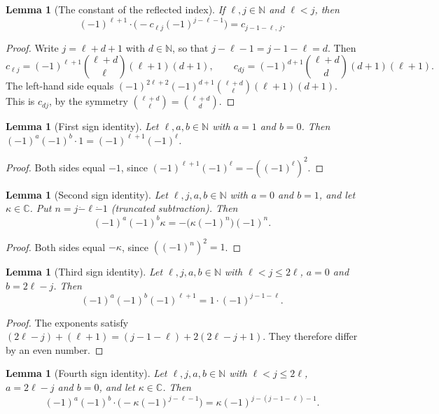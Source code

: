 \documentclass[11pt]{article}
\newtheorem{lemma}[theorem]{Lemma}
\theoremstyle{definition}
\theoremstyle{remark}
\newcommand{\CC}{\mathbb{C}}
\newcommand{\NN}{\mathbb{N}}
\newcommand{\monus}{\mathbin{\dot{-}}}
\begin{document}
\begin{lemma}[The constant of the reflected index]\label{lem:gm_pos_cst}
If $\ell,j\in\NN$ and $\ell<j$, then
\[
(-1)^{\ell+1}\cdot\bigl(-c_{\ell j}(-1)^{j-\ell-1}\bigr)=c_{j-1-\ell,\,j}.
\]
\end{lemma}

\begin{proof}
Write $j=\ell+d+1$ with $d\in\NN$, so that $j-\ell-1=j-1-\ell=d$. Then
\[
c_{\ell j}=(-1)^{\ell+1}\binom{\ell+d}{\ell}(\ell+1)(d+1),\qquad c_{d j}=(-1)^{d+1}\binom{\ell+d}{d}(d+1)(\ell+1).
\]
The left-hand side equals $(-1)^{2\ell+2}(-1)^{d+1}\binom{\ell+d}{\ell}(\ell+1)(d+1)$. This is $c_{dj}$, by the symmetry $\binom{\ell+d}{\ell}=\binom{\ell+d}{d}$.
\end{proof}

\begin{lemma}[First sign identity]\label{lem:gm_pos_signX}
Let $\ell,a,b\in\NN$ with $a=1$ and $b=0$. Then $(-1)^a(-1)^b\cdot1=(-1)^{\ell+1}(-1)^\ell$.
\end{lemma}

\begin{proof}
Both sides equal $-1$, since $(-1)^{\ell+1}(-1)^\ell=-((-1)^\ell)^2$.
\end{proof}

\begin{lemma}[Second sign identity]\label{lem:gm_pos_signY}
Let $\ell,j,a,b\in\NN$ with $a=0$ and $b=1$, and let $\kappa\in\CC$. Put $n=j\monus\ell\monus1$ (truncated subtraction). Then
\[
(-1)^a(-1)^b\kappa=-\bigl(\kappa(-1)^{n}\bigr)(-1)^{n}.
\]
\end{lemma}

\begin{proof}
Both sides equal $-\kappa$, since $((-1)^n)^2=1$.
\end{proof}

\begin{lemma}[Third sign identity]\label{lem:gm_pos_signX'}
Let $\ell,j,a,b\in\NN$ with $\ell<j\le2\ell$, $a=0$ and $b=2\ell-j$. Then
\[
(-1)^a(-1)^b(-1)^{\ell+1}=1\cdot(-1)^{j-1-\ell}.
\]
\end{lemma}

\begin{proof}
The exponents satisfy $(2\ell-j)+(\ell+1)=(j-1-\ell)+2(2\ell-j+1)$. They therefore differ by an even number.
\end{proof}

\begin{lemma}[Fourth sign identity]\label{lem:gm_pos_signY'}
Let $\ell,j,a,b\in\NN$ with $\ell<j\le2\ell$, $a=2\ell-j$ and $b=0$, and let $\kappa\in\CC$. Then
\[
(-1)^a(-1)^b\cdot\bigl(-\kappa(-1)^{j-\ell-1}\bigr)=\kappa(-1)^{j-(j-1-\ell)-1}.
\]
\end{lemma}
\end{document}
